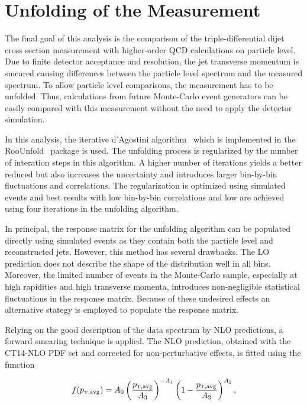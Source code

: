 \section{Unfolding of the Measurement}
\label{sec:unfolding}

The final goal of this analysis is the comparison of the triple-differential
dijet cross section measurement with higher-order QCD calculations on
particle level. Due to finite detector acceptance and resolution, the jet
transverse momentum is smeared causing differences between the particle level
\ptavg spectrum and the measured spectrum. To allow particle level comparisons,
the measurement has to be unfolded. Thus, calculations from future Monte-Carlo
event generators can be easily compared with this measurement without the need to
apply the detector simulation.

In this analysis, the iterative d'Agostini algorithm~\cite{DAgostini:1994zf}
which is implemented in the RooUnfold~\cite{Adye:2011gm} package is used. The
unfolding process is regularized by the number of interation steps in this
algorithm. A higher number of iterations yields a better reduced \chisq but also
increases the uncertainty and introduces larger bin-by-bin fluctuations and
correlations. The regularization is optimized using simulated events and best
results with low bin-by-bin correlations and low \chisq are achieved using
four iterations in the unfolding algorithm.

In principal, the response matrix for the unfolding algorithm can be populated
directly using simulated events as they contain both the particle level and
reconstructed jets. However, this method has several drawbacks. The LO
prediction does not describe the shape of the distribution well in all
bins. Moreover, the limited number of events in the Monte-Carlo sample,
especially at high rapidities and high transverse momenta, introduces
non-negligible statistical fluctuations in the response matrix. Because of these
undesired effects an alternative stategy is employed to populate the response
matrix.

Relying on the good description of the data spectrum by NLO predictions, a forward
smearing technique is applied. The NLO prediction, obtained with the CT14-NLO PDF
set and corrected for non-perturbative effects, is fitted using the function

\begin{equation}
    f(\ptavg) = A_0 \left(
    \frac{\ptavg}{A_3}\right)^{-A_1}\left(1-\frac{\ptavg}{A_3}\right)^{A_2},
\end{equation}


